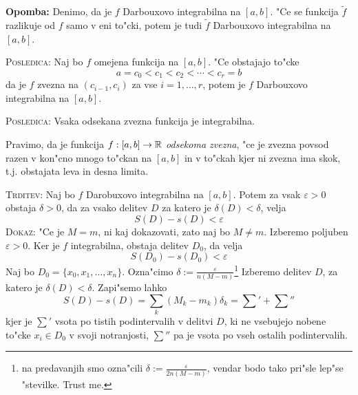 \textbf{Opomba:} Denimo, da je $f$ Darbouxovo integrabilna na $[a, b]$. "Ce se funkcija $\widetilde{f}$ razlikuje od $f$ samo v eni to"cki, potem je tudi $\widetilde{f}$ Darbouxovo integrabilna na $[a, b]$.

\textsc{Posledica:} Naj bo $f$ omejena funkcija na $[a, b]$. "Ce obstajajo to"cke
\begin{equation*}
a = c_0 < c_1 < c_2 < \cdots < c_r = b
\end{equation*}
da je $f$ zvezna na $(c_{i-1}, c_i)$ za vse $i = 1, \ldots, r$, potem je $f$ Darbouxovo integrabilna na $[a, b]$.

\textsc{Posledica:} Vsaka odsekana zvezna funkcija je integrabilna.

 Pravimo, da je funkcija $f: [a, b] \to \mathbb{R}$ \emph{odsekoma zvezna}, "ce je zvezna povsod razen v kon"cno mnogo to"ckan na $[a, b]$ in v to"ckah kjer ni zvezna ima skok, t.j. obstajata leva in desna limita.

\textsc{Trditev:} Naj bo $f$ Darobuxovo integrabilna na $[a, b]$. Potem za vsak $\varepsilon > 0$ obstaja $\delta > 0$, da za vsako delitev $D$ za katero je $\delta(D) < \delta$, velja
\begin{equation*}
S(D) - s(D) < \varepsilon
\end{equation*}
\textsc{Dokaz:} "Ce je $M = m$, ni kaj dokazovati, zato naj bo $M \neq m$. Izberemo poljuben $\varepsilon > 0$. Ker je $f$ integrabilna, obstaja delitev $D_0$, da velja
\begin{equation*}
S(D_0) - s(D_0) < \varepsilon
\end{equation*}
Naj bo $D_0 = \{x_0, x_1, \ldots, x_n\}$. Ozna"cimo $\delta := \frac{\varepsilon}{n(M-m)}$\footnote{na predavanjih smo ozna"cili $\delta := \frac{\varepsilon}{2n(M-m)}$, vendar bodo tako pri"sle lep"se "stevilke. Trust me.} Izberemo delitev $D$, za katero je $\delta(D) < \delta$. Zapi"semo lahko
\begin{equation*}
S(D) - s(D) = \sum_k (M_k - m_k) \delta_k = \sum' + \sum''
\end{equation*}
kjer je $\sum'$ vsota po tistih podintervalih v delitvi $D$, ki ne vsebujejo nobene to"cke $x_i \in D_0$ v svoji notranjosti, $\sum''$ pa je vsota po vseh ostalih podintervalih. 

